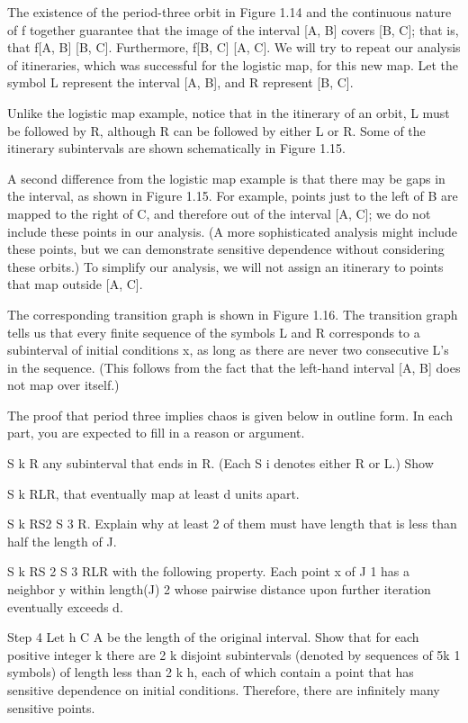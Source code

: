 \documentclass[12pt]{article}
\begin{document}
The existence of the period-three orbit in Figure 1.14 and the continuous nature of f together guarantee 
that the image of the interval [A, B] covers [B, C]; that is, that f[A, B]   [B, C]. Furthermore, f[B, C]  
[A, C]. We will try to repeat our analysis of itineraries, which was successful for the logistic map, for 
this new map. Let the symbol L represent the interval [A, B], and R represent [B, C].

Unlike the logistic map example, notice that in the itinerary of an orbit, L must be followed by R, 
although R can be followed by either L or R. Some of the itinerary subintervals are shown schematically in 
Figure 1.15.

A second difference from the logistic map example is that there may be gaps in the interval, as shown in 
Figure 1.15. For example, points just to the left of B are mapped to the right of C, and therefore out of 
the interval [A, C]; we do not include these points in our analysis. (A more sophisticated analysis might 
include these points, but we can demonstrate sensitive dependence without considering these orbits.) To 
simplify our analysis, we will not assign an itinerary to points that map outside [A, C].

The corresponding transition graph is shown in Figure 1.16. The transition graph tells us that every finite 
sequence of the symbols L and R corresponds to a subinterval of initial conditions x, as long as there are 
never two consecutive L’s in the sequence. (This follows from the fact that the left-hand interval [A, B] 
does not map over itself.)

The proof that period three implies chaos is given below in outline form. In each part, you are expected to 
fill in a reason or argument.

 S k R any subinterval that ends in R. (Each S i denotes either R or L.) Show

 S k RLR, that eventually map at least d units apart.

 S k RS2  S 3 R. Explain why at least 2 of them must have length that is less than half the length of J.

 S k RS 2 S 3 RLR with the following property. Each point x of J 1 has a neighbor y within length(J)  2 
whose pairwise distance upon further iteration eventually exceeds d.

Step 4 Let h  C  A be the length of the original interval. Show that for each positive integer k there are 
2 k disjoint subintervals (denoted by sequences of 5k 1 symbols) of length less than 2 k h, each of which 
contain a point that has sensitive dependence on initial conditions. Therefore, there are infinitely many 
sensitive points.
\end{document}
